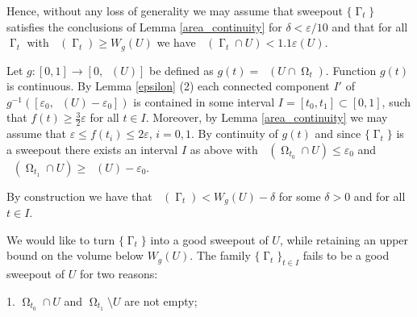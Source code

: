 \documentclass[12pt]{amsart}
\DeclareMathOperator{\Hn}{\mathcal{H}^n}
\DeclareMathOperator{\Hnn}{\mathcal{H}^{n+1}}
\DeclareMathOperator{\G}{\Gamma}
\DeclareMathOperator{\Om}{\Omega}
\theoremstyle{definition}
\begin{document}
Hence, without any loss of generality we may assume that 
sweepout $\{ \G_t \}$ satisfies the conclusions of Lemma \ref*{area_continuity}
for $\delta < \varepsilon/10$ and that 
for all $\G_t$ with $\Hn(\G_t) \geq W_g(U)$ we have
$\Hn(\G_t \cap U) < 1.1 \varepsilon(U)$.


Let $g: [0,1] \rightarrow
[0, \Hnn(U)]$ be defined as
$g(t)= \Hnn(U \cap \Om_t)$.
Function $g(t)$ is continuous.
By Lemma \ref*{epsilon} (2) each connected component $I'$ of
$g^{-1}([\varepsilon_0, \Hnn(U) - \varepsilon_0])$
is contained in some interval $I=[t_0,t_1] \subset [0,1]$, such that
$f(t) \geq \frac{3}{2} \varepsilon$ for all $t \in I$.
Moreover, by Lemma \ref*{area_continuity}
we may assume that $\varepsilon \leq f(t_i) \leq 2 \varepsilon$, $i=0,1$.
By continuity of $g(t)$ and since $\{ \G_t \}$
is a sweepout there exists an interval $I$ as above with
$\Hnn(\Om_{t_0} \cap U) \leq \varepsilon_0$
and $\Hnn(\Om_{t_1} \cap U) \geq \Hnn(U)- \varepsilon_0$.






By construction
 we have that
$\Hn(\G_t) < W_g(U) - \delta$ for some $\delta>0$ and
for all $t \in I$.

We would like to turn $\{\G_t\}$ into
a good sweepout of $U$, while retaining 
an upper bound on the volume below $W_g(U)$.
The family $\{\G_t\}_{t \in I}$ fails 
to be a good sweepout of $U$ for two reasons:

1. $\Om_{t_0} \cap U$ 
and $\Om_{t_1} \setminus U$ are not empty; 
\end{document}

